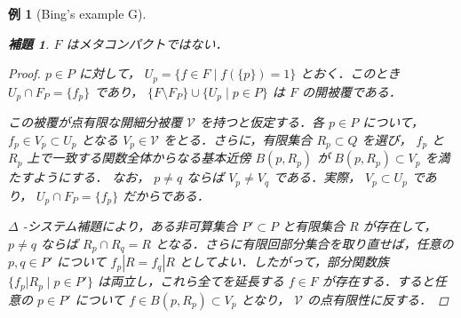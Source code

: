 \documentclass[leqno, 12pt]{ltjsarticle}
\newtheorem{lem}[thm]{補題}
\newtheorem{exam}[thm]{例}
\begin{document}
\begin{exam}[Bing's example G]
\begin{lem}
$F$
はメタコンパクトではない．
\end{lem}
\begin{proof}
$p\in P$
に対して，
$U_{p}=\{f\in F \mid f(\{p\})=1\}$
とおく．このとき
$U_{p}\cap F_{P}=\{f_{p}\}$
であり，
$\{F\setminus F_{P}\}\cup\{U_{p} \mid p\in P\}$
は
$F$
の開被覆である．

この被覆が点有限な開細分被覆
$\mathcal{V}$
を持つと仮定する．各
$p\in P$
について，
$f_{p}\in V_{p}\subset U_{p}$
となる
$V_{p}\in\mathcal{V}$
をとる．さらに，有限集合
$R_{p}\subset Q$
を選び，
$f_{p}$
と
$R_{p}$
上で一致する関数全体からなる基本近傍
$B(p,R_{p})$
が
$B(p,R_{p})\subset V_{p}$
を満たすようにする．
なお，
$p\neq q$
ならば
$V_{p}\neq V_{q}$
である．実際，
$V_{p}\subset U_{p}$
であり，
$U_{p}\cap F_{P}=\{f_{p}\}$
だからである．

$\Delta$
-システム補題により，ある非可算集合
$P'\subset P$
と有限集合
$R$
が存在して，
$p\neq q$
ならば
$R_{p}\cap R_{q}=R$
となる．さらに有限回部分集合を取り直せば，任意の
$p,q\in P'$
について
$f_{p}|R=f_{q}|R$
としてよい．したがって，部分関数族
$\{f_{p}|R_{p} \mid p\in P'\}$
は両立し，これら全てを延長する
$f\in F$
が存在する．すると任意の
$p\in P'$
について
$f\in B(p,R_{p})\subset V_{p}$
となり，
$\mathcal{V}$
の点有限性に反する．
\end{proof}
\end{exam}
\end{document}
